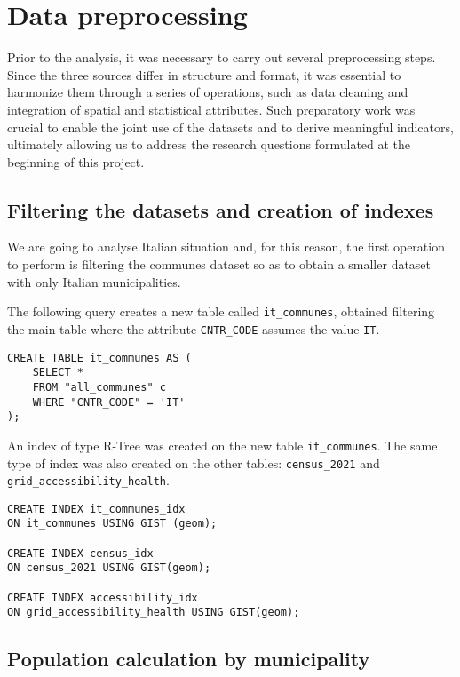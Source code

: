 \section{Data preprocessing}

Prior to the analysis, it was necessary to carry out several preprocessing steps.
Since the three sources differ in structure and format, it was essential to harmonize them through a series of operations, such as data cleaning and integration of spatial and statistical attributes.
Such preparatory work was crucial to enable the joint use of the datasets and to derive meaningful indicators, ultimately allowing us to address the research questions formulated at the beginning of this project.


\subsection{Filtering the datasets and creation of indexes}

We are going to analyse Italian situation and, for this reason, the first operation to perform is filtering the communes dataset so as to obtain a smaller dataset with only Italian municipalities.

The following query creates a new table called \texttt{it\_communes}, obtained filtering the main table where the attribute \texttt{CNTR\_CODE} assumes the value \texttt{IT}.

\begin{verbatim}
CREATE TABLE it_communes AS (
	SELECT *
	FROM "all_communes" c
	WHERE "CNTR_CODE" = 'IT'
);
\end{verbatim}

An index of type R-Tree was created on the new table \texttt{it\_communes}.
The same type of index was also created on the other tables: \texttt{census\_2021} and \texttt{grid\_accessibility\_health}.

\begin{verbatim}
CREATE INDEX it_communes_idx
ON it_communes USING GIST (geom);

CREATE INDEX census_idx
ON census_2021 USING GIST(geom);

CREATE INDEX accessibility_idx
ON grid_accessibility_health USING GIST(geom);
\end{verbatim}


\subsection{Population calculation by municipality}

